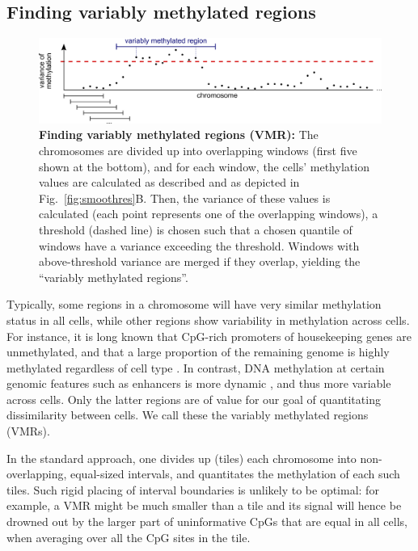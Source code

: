 \documentclass[twocolumn,10pt]{article}
\begin{document}
\subsection{Finding variably methylated regions}

\begin{figure}
    \includegraphics[width=\columnwidth]{figures/Fig_sliding.png}
    \caption{\small \textbf{Finding variably methylated regions (VMR):} The chromosomes are divided up into overlapping windows (first five shown at the bottom), and for each window, the cells' methylation values are calculated as described and as depicted in Fig.\ \ref{fig:smoothres}B. Then, the variance of these values is calculated (each point represents one of the overlapping windows), a threshold (dashed line) is chosen such that a chosen quantile of windows have a variance exceeding the threshold. Windows with above-threshold variance are merged if they overlap, yielding the ``variably methylated regions''.}
    \label{vmr}
\end{figure}


Typically, some regions in a chromosome will have very similar methylation status in all cells, while other regions show variability in methylation across cells. For instance, it is long known that CpG-rich promoters of housekeeping genes are unmethylated, and that a large proportion of the remaining genome is highly methylated regardless of cell type \citep{bird1986cpg}. In contrast, DNA methylation at certain genomic features such as enhancers is more dynamic \citep{argelaguet2019gastru}, and thus more variable across cells.
Only the latter regions are of value for our goal of quantitating dissimilarity between cells. We call these the variably methylated regions (VMRs).

In the standard approach, one divides up (tiles) each chromosome into non-overlapping, equal-sized intervals, and quantitates the methylation of each such tiles. Such rigid placing of interval boundaries is unlikely to be optimal: for example, a VMR might be much smaller than a tile and its signal will hence be drowned out by the larger part of uninformative CpGs that are equal in all cells, when averaging over all the CpG sites in the tile.
\end{document}
